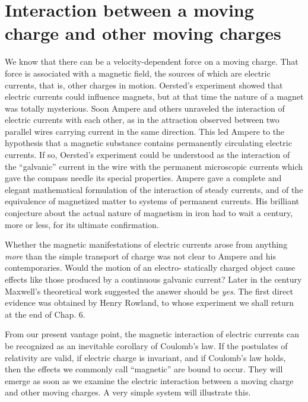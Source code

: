
\section[Interaction between a moving charge and other moving charges]
     [Interaction between a moving charge and other \ldots]{Interaction between a moving charge and other moving charges}

We know that there can be a velocity-dependent force on a moving
charge. That force is associated with a magnetic field, the sources of
which are electric currents, that is, other charges in motion.
Oersted's experiment showed that electric currents could influence
magnets, but at that time the nature of a magnet was totally
mysterious. Soon Ampere and others unraveled the interaction of
electric currents with each other, as in the attraction observed between
two parallel wires carrying current in the same direction. This
led Ampere to the hypothesis that a magnetic substance contains
permanently circulating electric currents. If so, Oersted's experiment
could be understood as the interaction of the ``galvanic'' current
in the wire with the permanent microscopic currents which gave
the compass needle its special properties. Ampere gave a complete
and elegant mathematical formulation of the interaction of steady
currents, and of the equivalence of magnetized matter to systems of
permanent currents. His brilliant conjecture about the actual nature
of magnetism in iron had to wait a century, more or less, for its
ultimate confirmation.

Whether the magnetic manifestations of electric currents arose
from anything \emph{more} than the simple transport of charge was not clear
to Ampere and his contemporaries. Would the motion of an electro-
statically charged object cause effects like those produced by a continuous
galvanic current? Later in the century Maxwell's theoretical
work suggested the answer should be \emph{yes}. The first direct evidence
was obtained by Henry Rowland, to whose experiment we shall return
at the end of Chap. 6.

From our present vantage point, the magnetic interaction of
electric currents can be recognized as an inevitable corollary
of Coulomb's law. If the postulates of relativity are valid, if electric
charge is invariant, and if Coulomb's law holds, then the effects we
commonly call ``magnetic'' are bound to occur. They will emerge as
soon as we examine the electric interaction between a moving charge
and other moving charges. A very simple system will illustrate this.

